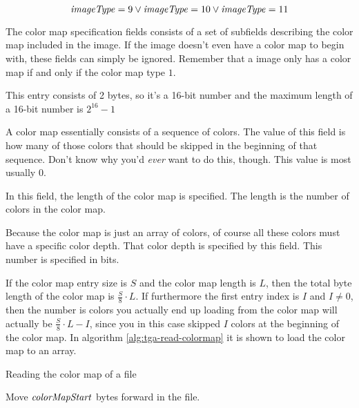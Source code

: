 \begin{equation*}
  \mathit{imageType} = 9 \vee \mathit{imageType} = 10 \vee \mathit{imageType} = 11
\end{equation*}


The color map specification fields consists of a set of subfields
describing the color map included in the image. If the image doesn't
even have a color map to begin with, these fields can simply be
ignored. Remember that a \tga image only has a color map if and only if
the color map type $1$.


This entry consists of 2 bytes, so it's a 16-bit number and the
maximum length of a 16-bit number is $2^{16} - 1$

A color map essentially consists of a sequence of colors. The value
of this field is how many of those colors that should be skipped in
the beginning of that sequence. Don't know why you'd \textit{ever}
want to do this, though. This value is most usually $0$.


In this field, the length of the color map is specified. The
length is the number of colors in the color map.


Because the color map is just an array of colors, of course all
these colors must have a specific color depth. That color depth is
specified by this field. This number is specified in bits.

If the color map entry size is $S$ and the color map length is $L$,
then the total byte length of the color map is $\frac{S}{8} \cdot
L$. If furthermore the first entry index is $I$ and $I \neq 0$, then
the number is colors you actually end up loading from the color map
will actually be $\frac{S}{8} \cdot L - I$, since you in this case
skipped $I$ colors at the beginning of the color map. In algorithm
\ref{alg:tga-read-colormap} it is shown to load the color map to an
array.

\begin{algorithm}[H]
  \caption{Reading the color map of a \tga file}
  \label{alg:tga-read-colormap}
  \begin{algorithmic}[1]

    \State Move $\mathit{colorMapStart}$ bytes forward in the file.

    \EndFor
    \end{algorithmic}
  \end{algorithm}

